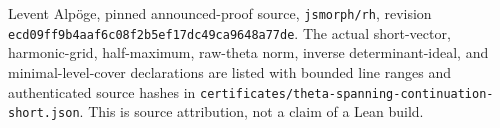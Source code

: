 Levent Alp\"oge, pinned announced-proof source,
\texttt{jsmorph/rh}, revision
\texttt{ecd09ff9b4aaf6c08f2b5ef17dc49ca9648a77de}.
The actual short-vector, harmonic-grid, half-maximum, raw-theta norm,
inverse determinant-ideal, and minimal-level-cover declarations are
listed with bounded line ranges and authenticated source hashes in
\texttt{certificates/theta-spanning-continuation-short.json}.
This is source attribution, not a claim of a Lean build.
